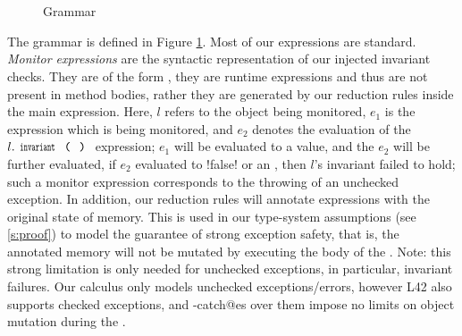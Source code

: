 \begin{figure}
\begin{grammatica}
		
		\\
		\\
		\\
		\\
		\\
		\\
		\\
	\end{grammatica}%
\caption{Grammar}\label{f:grammar}
\end{figure}


The grammar is defined in Figure \ref{f:grammar}. 
Most of our expressions are standard.
\emph{Monitor expressions}
are the syntactic representation of our injected invariant checks.
They are of the form , they 
are runtime expressions and thus are not present in method bodies, rather they are generated by our reduction rules inside the main expression. Here, $l$ refers to the object being monitored, $e_1$ is the expression which is being monitored, and $e_2$ denotes the evaluation of the $l.\invariant$ expression; $e_1$ will be evaluated to a value, and the $e_2$ will be further evaluated, if $e_2$ evaluated to \Q!false! or an \error, then $l$'s invariant failed to hold; such a monitor expression corresponds to the throwing of an unchecked exception.
In addition, our reduction rules will annotate \Q@try@ expressions with
the original state of memory. This is used in our type-system assumptions (see \ref{s:proof}) to model the guarantee of strong exception safety, that is, the annotated memory will not be mutated by executing the body of the \Q@try@.
Note: this strong limitation is only needed for unchecked exceptions, in particular, invariant failures. Our calculus only models unchecked exceptions/errors, however L42 also supports
checked exceptions, and \Q@try-catch@es over them impose no limits on object mutation during the \Q@try@.


